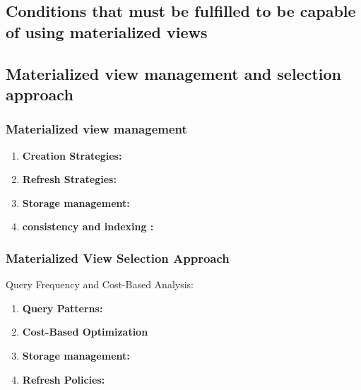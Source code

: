 \subsection{Conditions that must be fulfilled to be capable of using materialized views }

\subsection{ Materialized view management and selection approach}

\subsubsection{Materialized view management }


\begin{enumerate}[label=\alph*)]
    \item \textbf{Creation Strategies:}
    \item \textbf{Refresh Strategies:}
    \item \textbf{Storage management:}
    \item \textbf{consistency and  indexing :}
\end{enumerate}
\subsubsection{Materialized View Selection Approach}

  Query Frequency and Cost-Based Analysis:
  
\begin{enumerate}[label=\alph*)]
    \item \textbf{Query Patterns:}
    \item \textbf{Cost-Based Optimization}
    \item \textbf{Storage management:}
    \item \textbf{ Refresh Policies:}
\end{enumerate}



